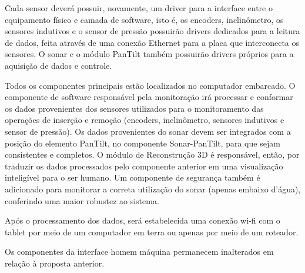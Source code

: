 Cada sensor deverá possuir, novamente, um driver para a interface entre o
equipamento físico e camada de software,
 isto é, os encoders, inclinômetro, os sensores indutivos e o sensor de pressão
 possuirão drivers dedicados para a leitura de dados,
feita através de uma conexão Ethernet para a placa que interconecta os sensores.
O sonar e o módulo PanTilt também possuirão drivers próprios para a aquisição de
dados e controle.

Todos os componentes principais estão localizados no computador embarcado.
O componente de software responsável pela monitoração irá processar e conformar
os dados provenientes dos sensores utilizados para o monitoramento das operações
de inserção e remoção (encoders, inclinômetro, sensores indutivos
 e sensor de pressão). Os dados provenientes do sonar devem ser integrados com a
 posição do elemento PanTilt,
  no componente Sonar-PanTilt, para que sejam consistentes e completos.  O
  módulo de Reconstrução 3D é responsável,
   então, por traduzir os dados processados pelo componente anterior em uma
   visualização inteligível para o ser humano.
Um componente de segurança também é adicionado para monitorar a correta
utilização do sonar (apenas embaixo d’água), conferindo uma maior robustez ao
sistema.

Após o processamento dos dados, será estabelecida uma conexão wi-fi com o tablet
por meio de um computador em terra ou
 apenas por meio de um roteador.
 
Os componentes da interface homem máquina permanecem inalterados em relação à
proposta anterior.